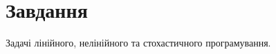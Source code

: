 
\chapter{Завдання \theHchapter}

\begin{tcolorbox}[title=Завдання 12]
    Задачі лінійного, нелінійного та стохастичного програмування.
\end{tcolorbox}


